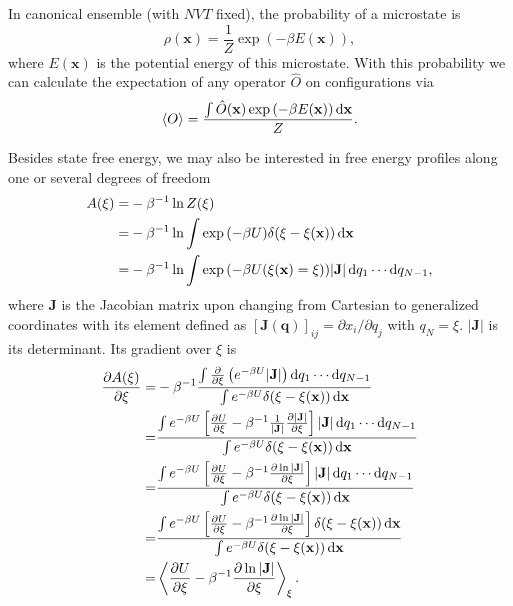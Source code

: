 In canonical ensemble (with $NVT$ fixed), the probability of a microstate is
\begin{equation}
\rho(\mathbf{x})=\frac{1}{Z}\exp{(-\beta E(\mathbf{x}))},
\end{equation}
where $E(\mathbf{x})$ is the potential energy of this microstate. With this probability we can calculate the expectation of any operator $\hat{O}$ on configurations via
\begin{equation}
\left<O\right>=\frac{\int \hat{O}(\mathbf{x})\exp{(-\beta E(\mathbf{x}))}\mathop{}\!\mathrm{d}\mathbf{x}}{Z}.
\end{equation}

Besides state free energy, we may also be interested in free energy profiles along one or several degrees of freedom
\begin{align}
	A(\xi)=&-\beta^{-1}\ln{Z(\xi)}\notag\\
	      =&-\beta^{-1}\ln\int \exp{\left(-\beta U\right)}\delta(\xi-\xi(\mathbf{x}))\mathop{}\!\mathrm{d}\mathbf{x}\notag\\
	      =&-\beta^{-1}\ln\int \exp{\left(-\beta U(\xi(\mathbf{x})=\xi)\right)}|\mathbf{J}|\mathop{}\!\mathrm{d} q_1\cdots \mathop{}\!\mathrm{d} q_{N-1},
\end{align}
where $\mathbf{J}$ is the Jacobian matrix upon changing from Cartesian to generalized coordinates with its element defined as $\left[\mathbf{J}(\mathbf{q})\right]_{ij}=\partial x_i/\partial q_j$ with $q_N=\xi$. $|\mathbf{J}|$ is its determinant. Its gradient over $\xi$ is
\begin{align}
\frac{\partial A(\xi)}{\partial \xi}=&-\beta^{-1}\frac{\int \frac{\partial}{\partial \xi}\left(e^{-\beta U}|\mathbf{J}|\right)\diff q_1\cdots \diff q_{N-1}}{\int e^{-\beta U}\delta(\xi-\xi(\mathbf{x}))\diff\mathbf{x}}\notag\\
                                    =&\frac{\int e^{-\beta U}\left[\frac{\partial U}{\partial \xi}-\beta^{-1}\frac{1}{|\mathbf{J}|}\frac{\partial |\mathbf{J}|}{\partial \xi}\right]|\mathbf{J}|\diff q_1\cdots \diff q_{N-1}}{\int e^{-\beta U}\delta(\xi-\xi(\mathbf{x}))\diff \mathbf{x}}\notag\\
                                    =&\frac{\int e^{-\beta U}\left[\frac{\partial U}{\partial \xi}-\beta^{-1}\frac{\partial \ln|\mathbf{J}|}{\partial \xi}\right]|\mathbf{J}|\diff q_1\cdots \diff q_{N-1}}{\int e^{-\beta U}\delta(\xi-\xi(\mathbf{x}))\diff \mathbf{x}}\notag\\
                                    =&\frac{\int e^{-\beta U}\left[\frac{\partial U}{\partial \xi}-\beta^{-1}\frac{\partial \ln|\mathbf{J}|}{\partial \xi}\right]\delta(\xi-\xi(\mathbf{x}))\diff\mathbf{x}}{\int e^{-\beta U}\delta(\xi-\xi(\mathbf{x}))\diff \mathbf{x}}\notag\\
                                    =&\left<\frac{\partial U}{\partial \xi}-\beta^{-1}\frac{\partial \ln |\mathbf{J}|}{\partial \xi}\right>_\xi.
                                    \label{Eq:Intro:meanforce}
\end{align}
